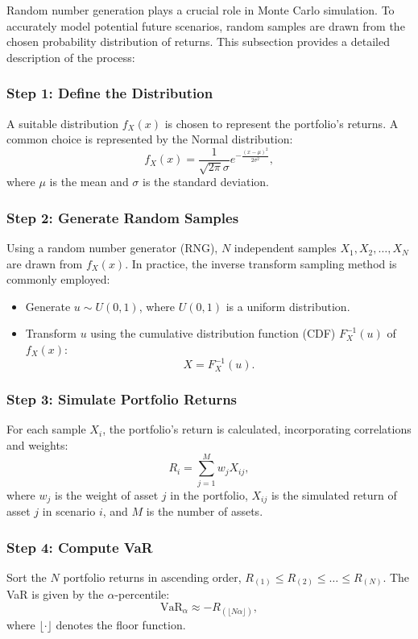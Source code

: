 \documentclass{article}
\begin{document}
Random number generation plays a crucial role in Monte Carlo simulation. To accurately model potential future scenarios, random samples are drawn from the chosen probability distribution of returns. This subsection provides a detailed description of the process:

\subsubsection{Step 1: Define the Distribution}
A suitable distribution $f_X(x)$ is chosen to represent the portfolio's returns. A common choice is represented by the Normal distribution: $$f_X(x) = \frac{1}{\sqrt{2\pi}\sigma} e^{-\frac{(x-\mu)^2}{2\sigma^2}},$$where $\mu$ is the mean and $\sigma$ is the standard deviation.

\subsubsection{Step 2: Generate Random Samples}
Using a random number generator (RNG), $N$ independent samples ${X_1, X_2, \dots, X_N}$ are drawn from $f_X(x)$. In practice, the inverse transform sampling method is commonly employed:
\begin{itemize}
\item Generate $u \sim U(0, 1)$, where $U(0, 1)$ is a uniform distribution.
\item Transform $u$ using the cumulative distribution function (CDF) $F_X^{-1}(u)$ of $f_X(x)$:
\begin{equation}
X = F_X^{-1}(u).
\end{equation}
\end{itemize}

\subsubsection{Step 3: Simulate Portfolio Returns}
For each sample $X_i$, the portfolio's return is calculated, incorporating correlations and weights:
\begin{equation}
R_i = \sum_{j=1}^M w_j X_{ij},
\end{equation}
where $w_j$ is the weight of asset $j$ in the portfolio, $X_{ij}$ is the simulated return of asset $j$ in scenario $i$, and $M$ is the number of assets.

\subsubsection{Step 4: Compute VaR}
Sort the $N$ portfolio returns in ascending order, $R_{(1)} \leq R_{(2)} \leq \dots \leq R_{(N)}$. The VaR is given by the $\alpha$-percentile:
\begin{equation}
\text{VaR}_{\alpha} \approx - R_{(\lfloor N \alpha \rfloor)},
\end{equation}
where $\lfloor \cdot \rfloor$ denotes the floor function.
\end{document}
